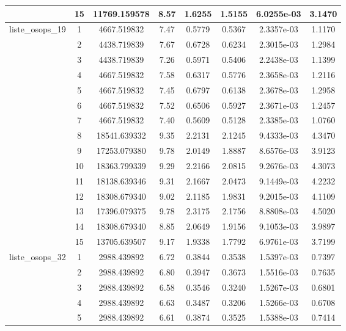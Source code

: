 \documentclass[12pt]{amsart}
\begin{document}
\begin{tabular}{|c|c|c|c|c|c|c|c|}
 & 15 &  11769.159578 &   8.57 &   1.6255 & 1.5155 &   6.0255e-03 & 3.1470 \\\hline\hline
 liste\_osops\_19 & 1 &   4667.519832 &   7.47 &   0.5779 & 0.5367 &   2.3357e-03 & 1.1170 \\\hline
 & 2 &   4438.719839 &   7.67 &   0.6728 & 0.6234 &   2.3015e-03 & 1.2984 \\\hline
 & 3 &   4438.719839 &   7.26 &   0.5971 & 0.5406 &   2.2438e-03 & 1.1399 \\\hline
 & 4 &   4667.519832 &   7.58 &   0.6317 & 0.5776 &   2.3658e-03 & 1.2116 \\\hline
 & 5 &   4667.519832 &   7.45 &   0.6797 & 0.6138 &   2.3678e-03 & 1.2958 \\\hline
 & 6 &   4667.519832 &   7.52 &   0.6506 & 0.5927 &   2.3671e-03 & 1.2457 \\\hline
 & 7 &   4667.519832 &   7.40 &   0.5609 & 0.5128 &   2.3385e-03 & 1.0760 \\\hline
 & 8 &  18541.639332 &   9.35 &   2.2131 & 2.1245 &   9.4333e-03 & 4.3470 \\\hline
 & 9 &  17253.079380 &   9.78 &   2.0149 & 1.8887 &   8.6576e-03 & 3.9123 \\\hline
 & 10 &  18363.799339 &   9.29 &   2.2166 & 2.0815 &   9.2676e-03 & 4.3073 \\\hline
 & 11 &  18138.639346 &   9.31 &   2.1667 & 2.0473 &   9.1449e-03 & 4.2232 \\\hline
 & 12 &  18308.679340 &   9.02 &   2.1185 & 1.9831 &   9.2015e-03 & 4.1109 \\\hline
 & 13 &  17396.079375 &   9.78 &   2.3175 & 2.1756 &   8.8808e-03 & 4.5020 \\\hline
 & 14 &  18308.679340 &   8.85 &   2.0649 & 1.9156 &   9.1053e-03 & 3.9897 \\\hline
 & 15 &  13705.639507 &   9.17 &   1.9338 & 1.7792 &   6.9761e-03 & 3.7199 \\\hline\hline
 liste\_osops\_32 & 1 &   2988.439892 &   6.72 &   0.3844 & 0.3538 &   1.5397e-03 & 0.7397 \\\hline
 & 2 &   2988.439892 &   6.80 &   0.3947 & 0.3673 &   1.5516e-03 & 0.7635 \\\hline
 & 3 &   2988.439892 &   6.58 &   0.3546 & 0.3240 &   1.5267e-03 & 0.6801 \\\hline
 & 4 &   2988.439892 &   6.63 &   0.3487 & 0.3206 &   1.5266e-03 & 0.6708 \\\hline
 & 5 &   2988.439892 &   6.61 &   0.3874 & 0.3525 &   1.5388e-03 & 0.7414 \\\hline

\end{tabular}
\end{document}
